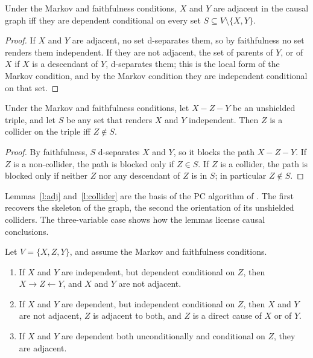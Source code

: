 \documentclass{situationist-preprint}
\begin{document}
\begin{lemma}[Adjacency]\label{l:adj}
Under the Markov and faithfulness conditions, $X$ and $Y$ are adjacent in the causal graph iff they are dependent conditional on every set $S \subseteq V \setminus \{X, Y\}$.
\end{lemma}

\begin{proof}
If $X$ and $Y$ are adjacent, no set d-separates them, so by faithfulness no set renders them independent. If they are not adjacent, the set of parents of $Y$, or of $X$ if $X$ is a descendant of $Y$, d-separates them; this is the local form of the Markov condition, and by the Markov condition they are independent conditional on that set.
\end{proof}

\begin{lemma}\label{l:collider}
Under the Markov and faithfulness conditions, let $X - Z - Y$ be an unshielded triple, and let $S$ be any set that renders $X$ and $Y$ independent. Then $Z$ is a collider on the triple iff $Z \notin S$.
\end{lemma}

\begin{proof}
By faithfulness, $S$ d-separates $X$ and $Y$, so it blocks the path $X - Z - Y$. If $Z$ is a non-collider, the path is blocked only if $Z \in S$. If $Z$ is a collider, the path is blocked only if neither $Z$ nor any descendant of $Z$ is in $S$; in particular $Z \notin S$.
\end{proof}

Lemmas~\ref{l:adj} and~\ref{l:collider} are the basis of the PC algorithm of \citet{SGS2000}. The first recovers the skeleton of the graph, the second the orientation of its unshielded colliders. The three-variable case shows how the lemmas license causal conclusions.

\begin{theorem}\label{t:three}
Let $V = \{X, Z, Y\}$, and assume the Markov and faithfulness conditions.
\begin{enumerate}[label=(\roman*)]
\item If $X$ and $Y$ are independent, but dependent conditional on $Z$, then $X \to Z \leftarrow Y$, and $X$ and $Y$ are not adjacent.
\item If $X$ and $Y$ are dependent, but independent conditional on $Z$, then $X$ and $Y$ are not adjacent, $Z$ is adjacent to both, and $Z$ is a direct cause of $X$ or of $Y$.
\item If $X$ and $Y$ are dependent both unconditionally and conditional on $Z$, they are adjacent.
\end{enumerate}
\end{theorem}
\end{document}
